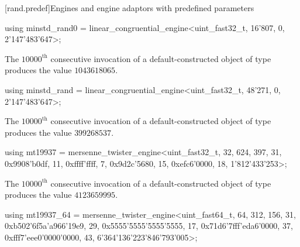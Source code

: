 

[rand.predef]{Engines and engine adaptors with predefined parameters}%
%
%

%
\begin{itemdecl}
using minstd_rand0 =
      linear_congruential_engine<uint_fast32_t, 16'807, 0, 2'147'483'647>;
\end{itemdecl}

\begin{itemdescr}
\pnum
\required
 The $10000^\text{th}$ consecutive invocation
 of a default-constructed object
 of type 
 produces the value $1043618065$.
\end{itemdescr}

%
\begin{itemdecl}
using minstd_rand =
      linear_congruential_engine<uint_fast32_t, 48'271, 0, 2'147'483'647>;
\end{itemdecl}

\begin{itemdescr}
\pnum
\required
 The $10000^\text{th}$ consecutive invocation
 of a default-constructed object
 of type 
 produces the value $399268537$.
\end{itemdescr}

%
\begin{itemdecl}
using mt19937 =
      mersenne_twister_engine<uint_fast32_t, 32, 624, 397, 31,
       0x9908'b0df, 11, 0xffff'ffff, 7, 0x9d2c'5680, 15, 0xefc6'0000, 18, 1'812'433'253>;
\end{itemdecl}

\begin{itemdescr}
\pnum
\required
 The $10000^\text{th}$ consecutive invocation
 of a default-constructed object
 of type 
 produces the value $4123659995$.
\end{itemdescr}

%
\begin{itemdecl}
using mt19937_64 =
      mersenne_twister_engine<uint_fast64_t, 64, 312, 156, 31,
       0xb502'6f5a'a966'19e9, 29, 0x5555'5555'5555'5555, 17,
       0x71d6'7fff'eda6'0000, 37, 0xfff7'eee0'0000'0000, 43, 6'364'136'223'846'793'005>;
\end{itemdecl}

